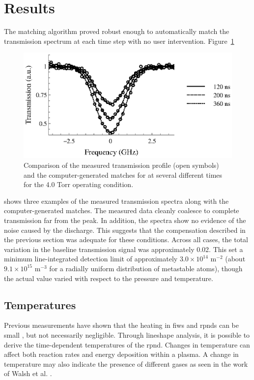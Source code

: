 \section{Results}

The matching algorithm proved robust enough to automatically match the
transmission spectrum at each time step with no user intervention.
Figure~\ref{fig:matching}
\begin{figure}
  \centering
  \includegraphics{./chapters/metastables/figures/matching.eps}
  \caption{Comparison of the measured transmission profile (open symbols) and
  the computer-generated matches for at several different times for the 4.0 Torr
  operating condition.}
  \label{fig:matching}
\end{figure}
shows three examples of the measured transmission spectra along with the
computer-generated matches. The measured data cleanly coalesce to complete
transmission far from the peak. In addition, the spectra show no evidence of the
noise caused by the discharge. This suggests that the compensation described in
the previous section was adequate for these conditions. Across all cases, the
total variation in the baseline transmission signal was approximately 0.02. This
set a minimum line-integrated detection limit of approximately $3.0 \times
10^{14}$ m$^{-2}$ (about $9.1\times10^{15}$ m$^{-3}$ for a radially uniform
distribution of metastable atoms), though the actual value varied with respect
to the pressure and temperature.

\subsection{Temperatures}

Previous measurements have shown that the heating in \acs{fiw}s and \acs{rpnd}s
can be small \cite{Zuzeek2010, Mintoussov2011}, but not necessarily negligible.
Through lineshape analysis, it is possible to derive the time-dependent
temperatures of the \acs{rpnd}. Changes in temperature can affect both reaction
rates and energy deposition within a plasma. A change in temperature may also
indicate the presence of different gases as seen in the work of Walsh et al.
\cite{Walsh2010}.

